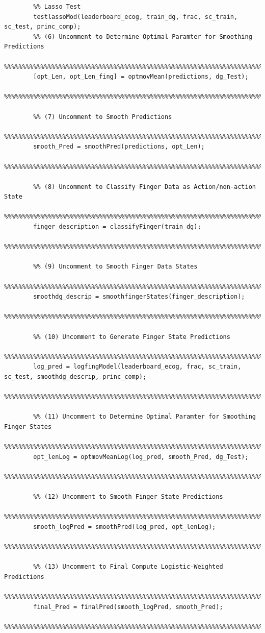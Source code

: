\documentclass{article}
\begin{document}
\begin{lstlisting}
		%% Lasso Test
		testlassoMod(leaderboard_ecog, train_dg, frac, sc_train, sc_test, princ_comp);
		%% (6) Uncomment to Determine Optimal Paramter for Smoothing Predictions
		%%%%%%%%%%%%%%%%%%%%%%%%%%%%%%%%%%%%%%%%%%%%%%%%%%%%%%%%%%%%%%%%%%%%%%%%%%%
		[opt_Len, opt_Len_fing] = optmovMean(predictions, dg_Test);
		%%%%%%%%%%%%%%%%%%%%%%%%%%%%%%%%%%%%%%%%%%%%%%%%%%%%%%%%%%%%%%%%%%%%%%%%%%%

		%% (7) Uncomment to Smooth Predictions
		%%%%%%%%%%%%%%%%%%%%%%%%%%%%%%%%%%%%%%%%%%%%%%%%%%%%%%%%%%%%%%%%%%%%%%%%%%%
		smooth_Pred = smoothPred(predictions, opt_Len);
		%%%%%%%%%%%%%%%%%%%%%%%%%%%%%%%%%%%%%%%%%%%%%%%%%%%%%%%%%%%%%%%%%%%%%%%%%%%

		%% (8) Uncomment to Classify Finger Data as Action/non-action State
		%%%%%%%%%%%%%%%%%%%%%%%%%%%%%%%%%%%%%%%%%%%%%%%%%%%%%%%%%%%%%%%%%%%%%%%%%%%
		finger_description = classifyFinger(train_dg);
		%%%%%%%%%%%%%%%%%%%%%%%%%%%%%%%%%%%%%%%%%%%%%%%%%%%%%%%%%%%%%%%%%%%%%%%%%%%

		%% (9) Uncomment to Smooth Finger Data States
		%%%%%%%%%%%%%%%%%%%%%%%%%%%%%%%%%%%%%%%%%%%%%%%%%%%%%%%%%%%%%%%%%%%%%%%%%%%
		smoothdg_descrip = smoothfingerStates(finger_description);
		%%%%%%%%%%%%%%%%%%%%%%%%%%%%%%%%%%%%%%%%%%%%%%%%%%%%%%%%%%%%%%%%%%%%%%%%%%%

		%% (10) Uncomment to Generate Finger State Predictions
		%%%%%%%%%%%%%%%%%%%%%%%%%%%%%%%%%%%%%%%%%%%%%%%%%%%%%%%%%%%%%%%%%%%%%%%%%%%
		log_pred = logfingModel(leaderboard_ecog, frac, sc_train, sc_test, smoothdg_descrip, princ_comp);
		%%%%%%%%%%%%%%%%%%%%%%%%%%%%%%%%%%%%%%%%%%%%%%%%%%%%%%%%%%%%%%%%%%%%%%%%%%%

		%% (11) Uncomment to Determine Optimal Paramter for Smoothing Finger States
		%%%%%%%%%%%%%%%%%%%%%%%%%%%%%%%%%%%%%%%%%%%%%%%%%%%%%%%%%%%%%%%%%%%%%%%%%%%
		opt_lenLog = optmovMeanLog(log_pred, smooth_Pred, dg_Test);
		%%%%%%%%%%%%%%%%%%%%%%%%%%%%%%%%%%%%%%%%%%%%%%%%%%%%%%%%%%%%%%%%%%%%%%%%%%%

		%% (12) Uncomment to Smooth Finger State Predictions
		%%%%%%%%%%%%%%%%%%%%%%%%%%%%%%%%%%%%%%%%%%%%%%%%%%%%%%%%%%%%%%%%%%%%%%%%%%%
		smooth_logPred = smoothPred(log_pred, opt_lenLog);
		%%%%%%%%%%%%%%%%%%%%%%%%%%%%%%%%%%%%%%%%%%%%%%%%%%%%%%%%%%%%%%%%%%%%%%%%%%%
		 
		%% (13) Uncomment to Final Compute Logistic-Weighted Predictions
		%%%%%%%%%%%%%%%%%%%%%%%%%%%%%%%%%%%%%%%%%%%%%%%%%%%%%%%%%%%%%%%%%%%%%%%%%%%
		final_Pred = finalPred(smooth_logPred, smooth_Pred);
		%%%%%%%%%%%%%%%%%%%%%%%%%%%%%%%%%%%%%%%%%%%%%%%%%%%%%%%%%%%%%%%%%%%%%%%%%%%


\end{lstlisting}
\end{document}
